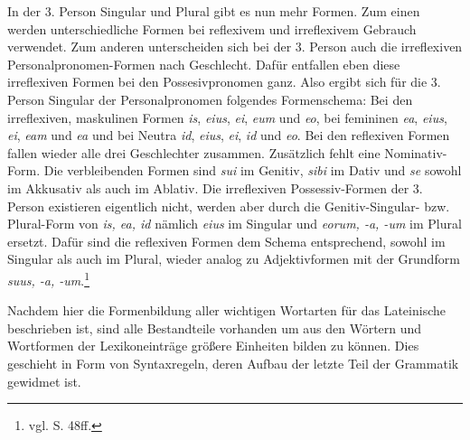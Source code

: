 In der 3. Person Singular und Plural gibt es nun mehr Formen. Zum einen werden unterschiedliche Formen bei reflexivem und irreflexivem Gebrauch verwendet. Zum anderen unterscheiden sich bei der 3. Person auch die irreflexiven Personalpronomen-Formen nach Geschlecht. Dafür entfallen eben diese irreflexiven Formen bei den Possesivpronomen ganz. Also ergibt sich für die 3. Person Singular der Personalpronomen folgendes Formenschema: Bei den irreflexiven, maskulinen Formen \textit{is}, \textit{eius}, \textit{ei}, \textit{eum} und \textit{eo}, bei femininen \textit{ea}, \textit{eius}, \textit{ei}, \textit{eam} und \textit{ea} und bei Neutra \textit{id}, \textit{eius}, \textit{ei}, \textit{id} und \textit{eo}. Bei den reflexiven Formen fallen wieder alle drei Geschlechter zusammen. Zusätzlich fehlt eine Nominativ-Form. Die verbleibenden Formen sind \textit{sui} im Genitiv, \textit{sibi} im Dativ und \textit{se} sowohl im Akkusativ als auch im Ablativ. Die irreflexiven Possessiv-Formen der 3. Person existieren eigentlich nicht, werden aber durch die Genitiv-Singular- bzw. Plural-Form von \textit{is, ea, id} nämlich \textit{eius} im Singular und \textit{eorum, -a, -um} im Plural ersetzt. Dafür sind die reflexiven Formen dem Schema entsprechend, sowohl im Singular als auch im Plural, wieder analog zu Adjektivformen mit der Grundform \textit{suus, -a, -um}.\footnote{vgl. \cite{BAYER-LINDAUER1994} S. 48ff.} \par
Nachdem hier die Formenbildung aller wichtigen Wortarten für das Lateinische beschrieben ist, sind alle Bestandteile vorhanden um aus den Wörtern und Wortformen der Lexikoneinträge größere Einheiten bilden zu können. Dies geschieht in Form von Syntaxregeln, deren Aufbau der letzte Teil der Grammatik gewidmet ist.